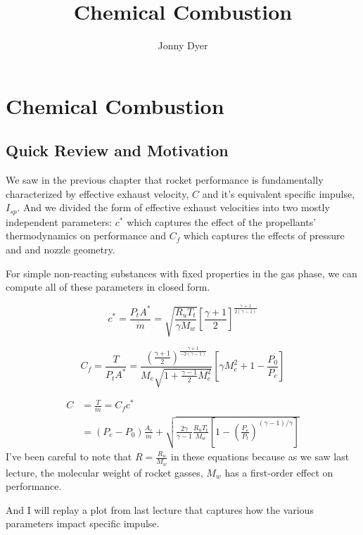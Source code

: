 \documentclass[twocolumn]{memoir} %
\title{Chemical Combustion}
\author{Jonny Dyer}
\begin{document}
\chapter*{Chemical Combustion}

\section{Quick Review and Motivation}
We saw in the previous chapter that rocket performance is fundamentally
characterized by effective exhaust velocity, $C$ and it's equivalent specific
impulse, $I_{sp}$.  And we divided the form of effective exhaust velocities into
two mostly independent parameters: $c^*$ which captures the effect of the
propellants' thermodynamics on performance and $C_f$ which captures the effects
of pressure and and nozzle geometry.

For simple non-reacting substances with fixed properties in the gas phase, we can
compute all of these parameters in closed form.

\begin{equation}
    c^* = \frac{P_t A^*}{\dot{m}} = \sqrt{\frac{R_u T_t}{\gamma M_w}}\left[\frac{\gamma + 1}{2}\right]^{\frac{\gamma + 1}{2(\gamma - 1)}}
    \label{eq:cstar}
\end{equation}


\begin{equation}
    C_f = \frac{T}{P_t A^*} = \frac{\left(\frac{\gamma + 1}{2}\right)^{\frac{\gamma + 1}{-2(\gamma-1)}}}{M_e \sqrt{1+\frac{\gamma - 1}{2}M_e^2}}\left[\gamma M_e^2 + 1 - \frac{P_0}{P_e}\right]
    \label{eq:Cf}
\end{equation}

\begin{equation}
    \begin{split}
        C &= \frac{T}{\dot{m}} = C_fc^* \\
        &= (P_e - P_0)\frac{A_e}{\dot{m}} + \sqrt{\frac{2 \gamma}{\gamma-1}\frac{R_u T_t}{M_w}\left[1 - \left(\frac{P_e}{P_t}\right)^{(\gamma - 1)/\gamma}\right]}
    \end{split}
    \label{eq:C}
\end{equation}
%
I've been careful to note that $R = \frac{R_u}{M_w}$ in these equations because as we saw last lecture, the
molecular weight of rocket gasses, $M_w$ has a first-order effect on performance.

And I will replay a plot from last lecture that captures how the various parameters impact specific impulse.
\end{document}
